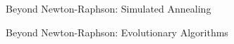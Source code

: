 \documentclass[ xcolor = pdftex, dvipsnames, table ]{beamer}
\begin{document}
%
%

\begin{frame}{Beyond Newton-Raphson: Simulated Annealing}
%
\begin{center}
\end{center}
%
\end{frame}

%
%

\begin{frame}{Beyond Newton-Raphson: Evolutionary Algorithms}
%
\begin{center}
\vspace{-0.3cm}
\end{center}
%
\end{frame}

%
%
\end{document}
